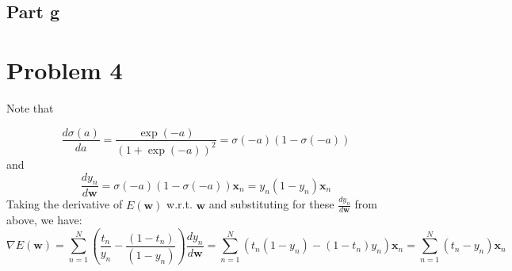 \documentclass{article}
\begin{document}
\subsection{Part g}

\section{Problem 4}

Note that

\begin{equation*}
\frac{d \sigma(a)}{d a} = \frac{\exp(-a)}{(1+ \exp(-a))^2} = \sigma(-a) (1-\sigma(-a))
\end{equation*}
and
\begin{equation*}
\frac{d y_n}{d \mathbf{w}} = \sigma(-a) (1-\sigma(-a)) \mathbf{x}_n = y_n (1-y_n) \mathbf{x}_n
\end{equation*}
Taking the derivative of $E(\mathbf{w})$ w.r.t. $\mathbf{w}$ and substituting for these $\frac{d y_n}{d \mathbf{w}}$ from above, we have:
\begin{equation*}
\nabla E(\mathbf{w}) = \sum_{n=1}^N (\frac{t_n}{y_n}  - \frac{(1-t_n)}{(1-y_n)}) \frac{d y_n}{d \mathbf{w}} = \sum_{n=1}^N (t_n(1-y_n)-(1-t_n)y_n) \mathbf{x}_n = \sum_{n=1}^N(t_n - y_n)\mathbf{x}_n
\end{equation*} 
\end{document}
